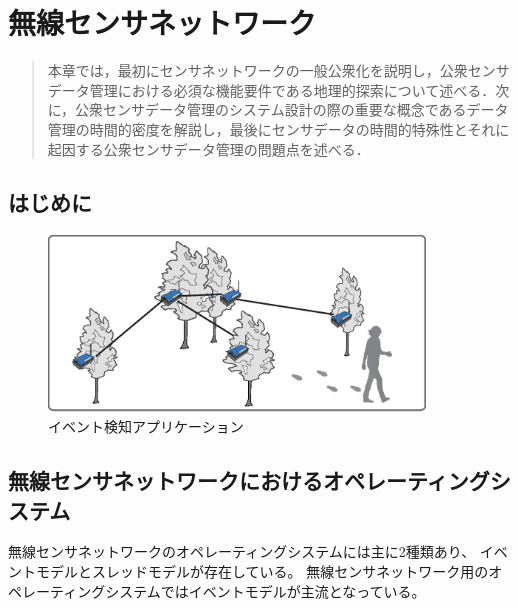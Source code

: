 \chapter{無線センサネットワーク}
\begin{large}
\begin{quote}
本章では，最初にセンサネットワークの一般公衆化を説明し，公衆センサデータ管理における必須な機能要件である地理的探索について述べる．次に，公衆センサデータ管理のシステム設計の際の重要な概念であるデータ管理の時間的密度を解説し，最後にセンサデータの時間的特殊性とそれに起因する公衆センサデータ管理の問題点を述べる．
\end{quote}
\end{large}
\clearpage

\section{はじめに}

\begin{figure}[htbp]
 \begin{center}
  \includegraphics[width=100mm]{./images/event_detection.eps}
 \end{center}
 \caption{イベント検知アプリケーション}
 \label{fig:event_detection}
\end{figure}


\section{無線センサネットワークにおけるオペレーティングシステム}
無線センサネットワークのオペレーティングシステムには主に2種類あり、
イベントモデルとスレッドモデルが存在している。
無線センサネットワーク用のオペレーティングシステムではイベントモデルが主流となっている。

